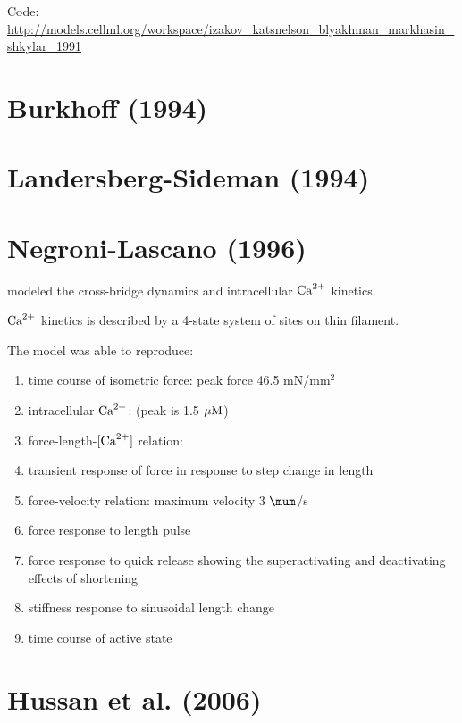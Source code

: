 Code:
\url{http://models.cellml.org/workspace/izakov_katsnelson_blyakhman_markhasin_shkylar_1991}


\section{Burkhoff (1994)}

\section{Landersberg-Sideman (1994)}



\section{Negroni-Lascano (1996)}

\citep{negroni1996} modeled the cross-bridge dynamics and intracellular ${\text{Ca}^{2+}}$
kinetics.

${\text{Ca}^{2+}}$ kinetics is described by a 4-state system of sites on thin filament.


The model was able to reproduce:
\begin{enumerate}
  \item time course of isometric force: peak force 46.5 mN/mm$^2$
  \item intracellular ${\text{Ca}^{2+}}$: (peak is 1.5 ${\mu\text{M}}$)
  \item force-length-$[{\text{Ca}^{2+}}]$ relation:
  \item transient response of force in response to step change in length
  \item force-velocity relation: maximum velocity 3 $\mum$/s
  \item force response to length pulse
  \item force response to quick release showing the superactivating and
  deactivating effects of shortening
  \item stiffness response to sinusoidal length change
  \item time course of active state
\end{enumerate}

\section{Hussan et al. (2006)}

\citep{hussan2006}
